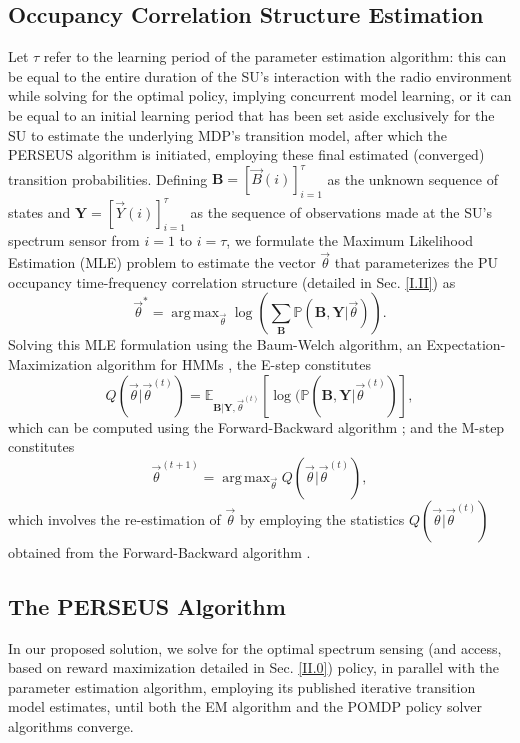 \documentclass[12pt, draftcls, onecolumn]{IEEEtran}
\newcommand{\bk}[1]{{\color{magenta}{[BK: #1]}}}
\DeclareMathOperator*{\argmax}{arg\,max}
\begin{document}
\subsection{Occupancy Correlation Structure Estimation}\label{II.I}
Let $\tau$ refer to the learning period of the parameter estimation algorithm: this can be equal to the entire duration of the SU's interaction with the radio environment while solving for the optimal policy, implying concurrent model learning, or it can  be equal to an initial learning period that has been set aside exclusively for the SU to estimate the underlying MDP's transition model, after which the PERSEUS algorithm is initiated, employing these final estimated (converged) transition probabilities. Defining $\mathbf{B}{=}[\vec{B}(i)]_{i{=}1}^{\tau}$ as the unknown sequence of states and $\mathbf{Y}{=}[\vec{Y}(i)]_{i{=}1}^{\tau}$ as the sequence of observations made at the SU's spectrum sensor from $i{=}1$ to $i{=}\tau$, we formulate the Maximum Likelihood Estimation (MLE) problem to estimate the vector $\vec{\theta}$ that parameterizes the PU occupancy time-frequency correlation structure (detailed in Sec. \ref{I.II}) as
\begin{equation}\label{19}
    \vec{\theta}^{*}=\argmax_{\vec{\theta}}\log{\left(\sum_{\mathbf{B}}\mathbb{P}(\mathbf{B},\mathbf{Y}|\vec{\theta})\right)}.
\end{equation}
Solving this MLE formulation using the Baum-Welch algorithm, an Expectation-Maximization algorithm for HMMs \cite{WCL:14}, the E-step constitutes
\begin{equation}\label{20}
    Q(\vec{\theta}|\vec{\theta}^{(t)})=\mathbb{E}_{\mathbf{B}|\mathbf{Y},\vec{\theta}^{(t)}}\left[\log{(\mathbb{P}(\mathbf{B},\mathbf{Y}|\vec{\theta}^{(t)})}\right],
\end{equation}
which can be computed using the Forward-Backward algorithm \cite{WCL:14}; and the M-step constitutes
\begin{equation}\label{21}
    \vec{\theta}^{(t+1)}=\argmax_{\vec{\theta}}Q(\vec{\theta}|\vec{\theta}^{(t)}),
\end{equation}
which involves the re-estimation of $\vec{\theta}$ by employing the statistics $Q(\vec{\theta}|\vec{\theta}^{(t)})$ obtained from the Forward-Backward algorithm \bk{Equations?}.

\subsection{The PERSEUS Algorithm}\label{II.II}
In our proposed solution, we solve for the optimal spectrum sensing (and access, based on reward maximization detailed in Sec. \ref{II.0}) policy, in parallel with the parameter estimation algorithm, employing its published iterative transition model estimates, until both the EM algorithm and the POMDP policy solver algorithms converge.
\end{document}
